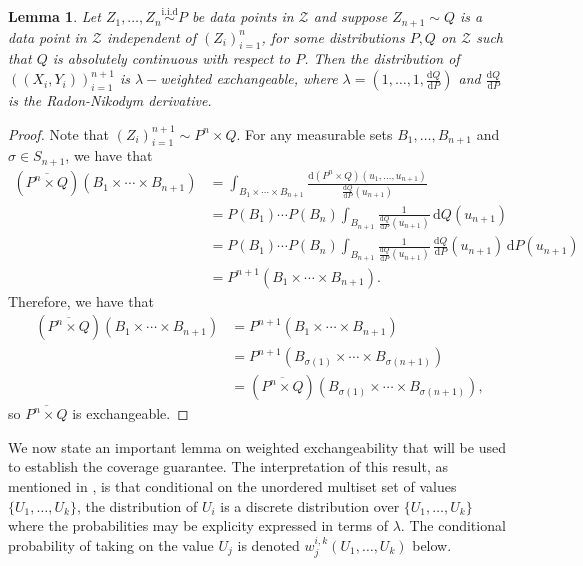 \documentclass[11pt, titlepage]{article} %
\newcommand{\R}{\mathrm}
\numberwithin{equation}{section}
\newtheorem{lemma}{Lemma}
\theoremstyle{definition}
\numberwithin{theorem}{section}
\numberwithin{lemma}{section}
\numberwithin{corollary}{section}
\numberwithin{proposition}{section}
\numberwithin{definition}{section}
\numberwithin{remark}{section}
\begin{document}
\begin{lemma}
    Let \(Z_1, \ldots, Z_n \overset{\R{i.i.d}}{\sim} P \) be data points in \(\mathcal{Z}\) and suppose \(Z_{n+1} \sim Q\) is a data point in \(\mathcal{Z}\) independent of \((Z_i)_{i=1}^n\), for some distributions \(P, Q\) on \(\mathcal{Z}\) such that \(Q\) is absolutely continuous with respect to \(P\). Then the distribution of \(((X_i, Y_i))_{i=1}^{n+1}\) is \(\lambda-\)weighted exchangeable, where \(\lambda = \left(1, \ldots, 1, \frac{\R{d}Q}{\R{d}P}\right)\) and \(\frac{\R{d}Q}{\R{d}P}\) is the Radon-Nikodym derivative.
\label{lemma:dist_shift_weighted_exch}
\end{lemma}
\begin{proof}
    Note that \((Z_i)_{i=1}^{n+1} \sim P^{n} \times Q\). For any measurable sets \(B_1, \ldots, B_{n+1}\) and \(\sigma \in S_{n+1}\), we have that \begin{align*}
        (\overline{P^n \times Q})(B_1 \times \cdots \times B_{n+1}) &= \int_{B_1 \times \cdots \times B_{n+1}} \frac{\R{d}(P^n \times Q)(u_1, \ldots, u_{n+1})}{\frac{\R{d}Q}{\R{d}P}(u_{n+1})} \\
        &= P(B_1) \cdots P(B_n) \int_{B_{n+1}} \frac{1}{\frac{\R{d}Q}{\R{d}P}(u_{n+1})} \, \R{d}Q(u_{n+1}) \\
        &= P(B_1) \cdots P(B_n) \int_{B_{n+1}} \frac{1}{\frac{\R{d}Q}{\R{d}P}(u_{n+1})} \, \frac{\R{d}Q}{\R{d}P}(u_{n+1}) \, \R{d}P(u_{n+1}) \\
        &= P^{n+1}(B_1 \times \cdots \times B_{n+1}).
    \end{align*}
    Therefore, we have that \begin{align*}
        (\overline{P^n \times Q})(B_1 \times \cdots \times B_{n+1}) &= P^{n+1}(B_1 \times \cdots \times B_{n+1}) \\
        &= P^{n+1}(B_{\sigma(1)} \times \cdots \times B_{\sigma(n+1)}) \\
        &= (\overline{P^n \times Q})(B_{\sigma(1)} \times \cdots \times B_{\sigma(n+1)}),
    \end{align*} so \(\overline{P^n \times Q}\) is exchangeable.
\end{proof}

\noindent
We now state an important lemma on weighted exchangeability that will be used to establish the coverage guarantee. The interpretation of this result, as mentioned in \cite{barber2024finetti}, is that conditional on the unordered multiset set of values \(\{U_1, \ldots, U_k\}\), the distribution of \(U_i\) is a discrete distribution over \(\{U_1, \ldots, U_k\}\) where the probabilities may be explicity expressed in terms of \(\lambda\). The conditional probability of taking on the value \(U_j\) is denoted \(w^{i, k}_j(U_1, \ldots, U_k)\) below. \vskip5pt
\end{document}
